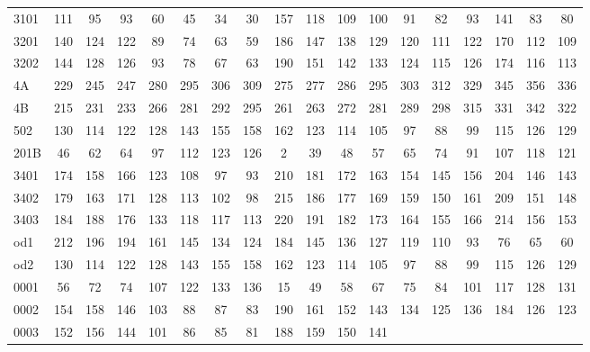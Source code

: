 \begin{table}[htbp]
\begin{center}
{\begin{tabular}{lccccccccccccccccc}
3101 & 111 & 95 & 93 & 60 & 45 & 34 & 30 & 157 & 118 & 109 & 100 & 91
						   & 82 & 93 & 141 & 83
								   & 80 \\
3201 & 140 & 124 & 122 & 89 & 74 & 63 & 59 & 186 & 147 & 138 & 129 &
						   120 & 111 & 122 & 170
							       & 112 &
								       109 \\
3202 & 144 & 128 & 126 & 93 & 78 & 67 & 63 & 190 & 151 & 142 & 133 &
						   124 & 115 & 126 & 174
							       & 116 &
								       113 \\
4A & 229 & 245 & 247 & 280 & 295 & 306 & 309 & 275 & 277 & 286 & 295
					       & 303 & 312 & 329 & 345 &
								   356 &
								       336 \\
4B & 215 & 231 & 233 & 266 & 281 & 292 & 295 & 261 & 263 & 272 & 281
					       & 289 & 298 & 315 & 331 &
								   342 &
								       322 \\
502 & 130 & 114 & 122 & 128 & 143 & 155 & 158 & 162 & 123 & 114 & 105
					       & 97 & 88 & 99 & 115 &
								   126 &
								       129 \\
201B & 46 & 62 & 64 & 97 & 112 & 123 & 126 & 2 & 39 & 48 & 57 & 65 &
						       74 & 91 & 107 &
								   118 &
								       121 \\
3401 & 174 & 158 & 166 & 123 & 108 & 97 & 93 & 210 & 181 & 172 & 163 &
						   154 & 145 & 156 & 204
							       & 146 &
								       143 \\
3402 & 179 & 163 & 171 & 128 & 113 & 102 & 98 & 215 & 186 & 177 & 169
					       & 159 & 150 & 161 & 209 &
								   151 &
								       148 \\
3403 & 184 & 188 & 176 & 133 & 118 & 117 & 113 & 220 & 191 & 182 & 173
					       & 164 & 155 & 166 & 214 &
								   156 &
								       153 \\
od1 & 212 & 196 & 194 & 161 & 145 & 134 & 124 & 184 & 145 & 136 & 127
					       & 119 & 110 & 93 & 76 &
								   65 &
								       60 \\
od2 & 130 & 114 & 122 & 128 & 143 & 155 & 158 & 162 & 123 & 114 & 105
					       & 97 & 88 & 99 & 115 &
								   126 &
								       129 \\
0001 & 56 & 72 & 74 & 107 & 122 & 133 & 136 & 15 & 49 & 58 & 67 & 75 &
						       84 & 101 & 117 &
								   128 &
								       131 \\
0002 & 154 & 158 & 146 & 103 & 88 & 87 & 83 & 190 & 161 & 152 & 143 &
						   134 & 125 & 136 & 184
							       & 126 &
								       123 \\
0003 & 152 & 156 & 144 & 101 & 86 & 85 & 81 & 188 & 159 & 150 & 141 &

\end{tabular}}
\end{center}
\end{table}
